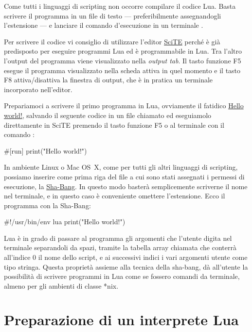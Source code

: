 


Come tutti i linguaggi di scripting non occorre compilare il codice Lua. Basta
scrivere il programma in un file di testo --- preferibilmente assegnandogli
l'estensione  --- e lanciare il comando d'esecuzione in un terminale
.

Per scrivere il codice vi consiglio di utilizzare l'editor
\href{http://www.scintilla.org/SciTE.html}{SciTE} perché è già predisposto per
eseguire programmi Lua ed è programmabile in Lua. Tra l'altro l'output del
programma viene visualizzato nella \emph{output tab}. Il tasto funzione F5
esegue il programma visualizzato nella scheda attiva in quel momento e il tasto
F8 attiva/disattiva la finestra di output, che è in pratica un terminale
incorporato nell'editor.

Prepariamoci a scrivere il primo programma in Lua, ovviamente il fatidico
\href{http://en.wikipedia.org/wiki/%22Hello,_world!%22_program"}{Hello world!},
salvando il seguente codice in un file chiamato  ed eseguiamolo
direttamente in SciTE premendo il tasto funzione F5 o al terminale con il
comando :
\begin{lines}
#[run]
print("Hello world!")
\end{lines}

In ambiente Linux o Mac OS~X, come per tutti gli altri linguaggi di scripting,
possiamo inserire come prima riga del file a cui sono stati assegnati i permessi
di esecuzione, la
\href{http://en.wikipedia.org/wiki/Shebang_%28Unix%29}{Sha-Bang}. In questo modo
basterà semplicemente scriverne il nome nel terminale, e in questo caso è
conveniente omettere l'estensione. Ecco il programma con la Sha-Bang:
\begin{lines}
#!/usr/bin/env lua
print("Hello world!")
\end{lines}

Lua è in grado di passare al programma gli argomenti che l'utente digita nel
terminale separandoli da spazi, tramite la tabella array chiamata  che
conterrà all'indice 0 il nome dello script, e ai successivi indici i vari
argomenti utente come tipo stringa. Questa proprietà assieme alla tecnica della
sha-bang, dà all'utente la possibilità di scrivere programmi in Lua come se
fossero comandi da terminale, almeno per gli ambienti di classe *nix.

\chapter{Preparazione di un interprete Lua}

